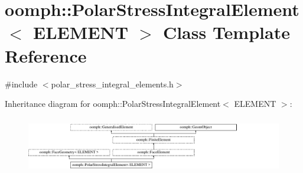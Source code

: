 \hypertarget{classoomph_1_1PolarStressIntegralElement}{}\section{oomph\+:\+:Polar\+Stress\+Integral\+Element$<$ E\+L\+E\+M\+E\+NT $>$ Class Template Reference}
\label{classoomph_1_1PolarStressIntegralElement}


{\ttfamily \#include $<$polar\+\_\+stress\+\_\+integral\+\_\+elements.\+h$>$}

Inheritance diagram for oomph\+:\+:Polar\+Stress\+Integral\+Element$<$ E\+L\+E\+M\+E\+NT $>$\+:\begin{figure}[H]
\begin{center}
\leavevmode
\includegraphics[height=2.522522cm]{classoomph_1_1PolarStressIntegralElement}
\end{center}
\end{figure}
